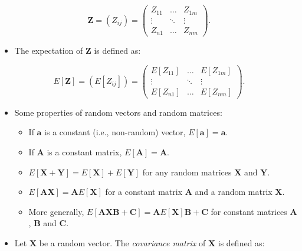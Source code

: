 \documentclass[
  12pt,
]{book}
\providecommand{\tightlist}{%
  \setlength{\itemsep}{0pt}\setlength{\parskip}{0pt}}
\begin{document}
\[
\boldsymbol{Z} = (Z_{ij}) =
\left(\begin{array}{ccc} Z_{11} & \ldots & Z_{1m} \\
                         \vdots & \ddots & \vdots \\
                         Z_{n1} & \ldots & Z_{nm} \end{array}\right).
\]

\begin{itemize}
\tightlist
\item
  The expectation of \(\boldsymbol{Z}\) is defined as:
\end{itemize}

\[
E[\boldsymbol{Z}] = (E[Z_{ij}]) =
\left(\begin{array}{ccc} E[Z_{11}] & \ldots & E[Z_{1m}] \\
                         \vdots    & \ddots & \vdots    \\
                         E[Z_{n1}] & \ldots & E[Z_{nm}] \end{array}\right).
\]

\begin{itemize}
\item
  Some properties of random vectors and random matrices:

  \begin{itemize}
  \item
    If \(\boldsymbol{a}\) is a constant (i.e., non-random) vector, \(E[\boldsymbol{a}] = \boldsymbol{a}\).
  \item
    If \(\boldsymbol{A}\) is a constant matrix, \(E[\boldsymbol{A}] = \boldsymbol{A}\).
  \item
    \(E[\boldsymbol{X} + \boldsymbol{Y}] = E[\boldsymbol{X}] + E[\boldsymbol{Y}]\) for any random matrices \(\boldsymbol{X}\) and \(\boldsymbol{Y}\).
  \item
    \(E[\boldsymbol{A}\boldsymbol{X}] = \boldsymbol{A} E[\boldsymbol{X}]\) for a constant matrix \(\boldsymbol{A}\) and a random matrix \(\boldsymbol{X}\).
  \item
    More generally, \(E[\boldsymbol{A}\boldsymbol{X}\boldsymbol{B} + \boldsymbol{C}] = \boldsymbol{A}E[\boldsymbol{X}]\boldsymbol{B} + \boldsymbol{C}\) for constant matrices \(\boldsymbol{A}\), \(\boldsymbol{B}\) and \(\boldsymbol{C}\).
  \end{itemize}
\item
  Let \(\boldsymbol{X}\) be a random vector. The \emph{covariance matrix} of \(\boldsymbol{X}\) is defined as:
\end{itemize}
\end{document}
